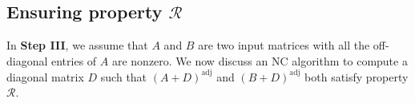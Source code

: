 \documentclass[11pt,letterpaper]{article}
\DeclareMathOperator*{\diag}{diag}
\DeclareMathOperator*{\rank}{rank}
\newcommand{\comp}[1]{\overline{#1}}
\newtheorem{theorem}{Theorem}[section]
\newtheorem{lemma}{Lemma}[section]
\DeclareMathOperator{\ad}{adj}
\newcommand{\adj}[1]{(#1)^{\ad}}
\newcommand{\prop}{\mathcal{R}}
\begin{document}
{{{\subsection{Ensuring property $\prop$} 
\label{subsec:NC-algo-performing-step-III}
In \textbf{Step III}, we assume that $A$ and $B$ are two input matrices with all the off-diagonal entries of $A$ are nonzero. We now discuss an NC algorithm to compute a diagonal matrix $D$ such that $\adj{A+D}$ and $\adj{B+D}$ both satisfy property $\prop$.

}}}
\end{document}
